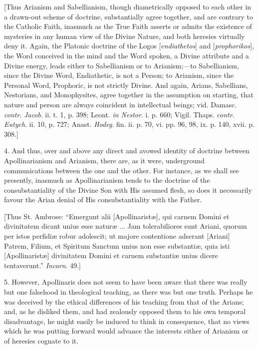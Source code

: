 [Thus Arianism and Sabellianism, though diametrically opposed to
each other in a drawn-out scheme of doctrine, substantially agree
together, and are contrary to the Catholic Faith, inasmuch as the True
Faith asserts or admits the existence of mysteries in any human view
of the Divine Nature, and both heresies virtually deny it. Again, the
Platonic doctrine of the Logos [\emph{endiathetos}] and [\emph{prophorikos}],
the Word conceived in the mind and the Word spoken, a Divine attribute
and a Divine energy, leads either to Sabellianism or to Arianism;—to
Sabellianism, since the Divine Word, Endiathetic, is not a Person; to
Arianism, since the Personal Word, Prophoric, is not strictly Divine.
And again, Arians, Sabellians, Nestorians, and Monophysites, agree
together in the assumption on starting, that nature and person are
always coincident in intellectual beings; vid. Damasc. \emph{contr}. \emph{Jacob}.
ii. t. 1, p. 398; Leont. \emph{in Nestor}. i. p. 660; Vigil. Thaps. \emph{contr}.
\emph{Eutych}. ii. 10, p. 727; Anast. \emph{Hodeg}. fin. ii. p. 70,
vi. pp. 96, 98, ix. p. 140, xvii. p. 308.]

4. And thus, over and above any direct and avowed identity of
doctrine between Apollinarianism and Arianism, there are, as it were,
underground communications between the one and the other. For
instance, as we shall see presently, inasmuch as Apollinarianism tends
to the doctrine of the consubstantiality of the Divine Son with His
assumed flesh, so does it necessarily favour the Arian denial of His
consubstantiality with the Father.

[Thus St. Ambrose: ``Emergunt alii [Apollinaristæ], qui carnem
Domini et divinitatem dicant unius esse naturæ ... Jam tolerabiliores
sunt Ariani, quorum per istos perfidiæ robur adolescit; ut majore
contentione adserant [Ariani] Patrem, Filium, et Spiritum Sanctum
unius non esse substantiæ, quia isti [Apollinaristæ] divinitatem
Domini et carnem substantiæ unius dicere tentaverunt.'' \emph{Incarn}.
49.]

5. However, Apollinaris does not seem to have been aware that there
was really but one falsehood in theological teaching, as there
was but one truth. Perhaps he was deceived by the ethical differences
of his teaching from that of the Arians; and, as he disliked them, and
had zealously opposed them to his own temporal disadvantage, he might
easily be induced to think in consequence, that no views which he was
putting forward would advance the interests either of Arianism or of
heresies cognate to it.

